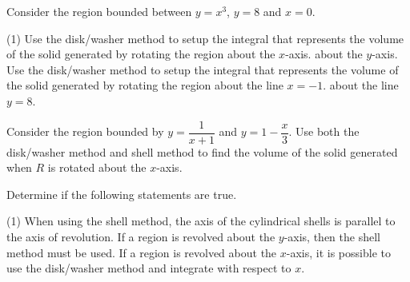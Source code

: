 \documentclass[../mathNotesPreamble]{subfiles}
\begin{document}
  \begin{ex*}
    Consider the region bounded between $y=x^3$, $y=8$ and $x=0$.
  \end{ex*}
  \begin{flushright}
  \end{flushright}
  \begin{tasks}[after-item-skip=\stretch{1}, label=](1)
    \task 
      Use the disk/washer method to setup the integral that represents the volume of the solid generated by rotating the region about the $x$-axis.
    \task 
      about the $y$-axis.
    \task 
      Use the disk/washer method to setup the integral that represents the volume of the solid generated by rotating the region about the line $x=-1$.
    \task 
      about the line $y=8$.
  \end{tasks}
  \pagebreak

  \begin{ex*}
    Consider the region bounded by $y=\dfrac{1}{x+1}$ and $y=1-\dfrac{x}{3}$. Use both the disk/washer method and shell method to find the volume of the solid generated when $R$ is rotated about the $x$-axis.
  \end{ex*}
  \pagebreak

  \begin{ex*}
    Determine if the following statements are true.
  \end{ex*}
  \begin{tasks}[after-item-skip=\stretch{1}, label=](1)
    \task 
      When using the shell method, the axis of the cylindrical shells is parallel to the axis of revolution.
    \task 
      If a region is revolved about the $y$-axis, then the shell method must be used.
    \task 
      If a region is revolved about the $x$-axis, it is possible to use the disk/washer method and integrate with respect to $x$.
  \end{tasks}
  \pagebreak
\end{document}
